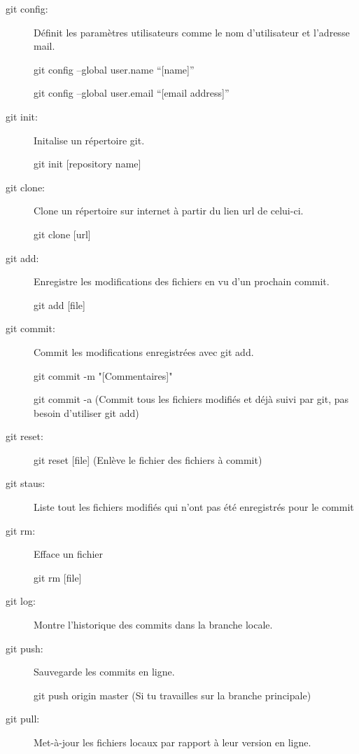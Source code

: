 \documentclass[a4paper, 11pt]{report}
\begin{document}
\begin{description}
\item[git config:] Définit les paramètres utilisateurs comme le nom d'utilisateur et l'adresse mail.

git config –global user.name “[name]”

git config –global user.email “[email address]”

\item[git init:]Initalise un répertoire git.

git init [repository name]

\item[git clone:]Clone un répertoire sur internet à partir du lien url de celui-ci.

git clone [url]

\item[git add:]Enregistre les modifications des fichiers en vu d'un prochain commit.

git add [file]

\item[git commit:] Commit les modifications enregistrées avec git add.

git commit -m "[Commentaires]"

git commit -a (Commit tous les fichiers modifiés et déjà suivi par git, pas besoin d'utiliser git add)

\item[git reset:]

git reset [file] (Enlève le fichier des fichiers à commit)

\item[git staus:] Liste tout les fichiers modifiés qui n'ont pas été enregistrés pour le commit

\item[git rm:] Efface un fichier

git rm [file]

\item[git log:] Montre l'historique des commits dans la branche locale.

\item[git push:] Sauvegarde les commits en ligne.

git push origin master (Si tu travailles sur la branche principale)

\item[git pull:] Met-à-jour les fichiers locaux par rapport à leur version en ligne.

\end{description}
\end{document}
